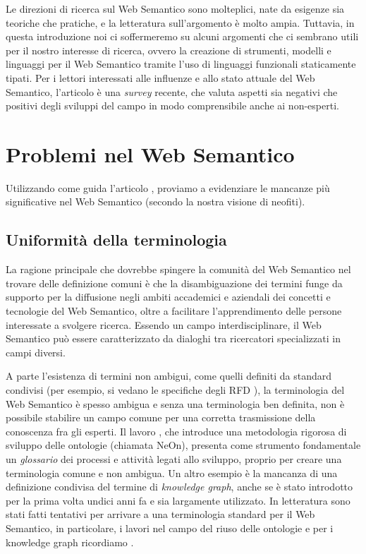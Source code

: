 Le direzioni di ricerca sul Web Semantico sono molteplici, nate da esigenze sia teoriche che pratiche, e la letteratura sull'argomento è molto ampia. Tuttavia, in questa introduzione noi ci soffermeremo su alcuni argomenti che ci sembrano utili per il nostro interesse di ricerca, ovvero la creazione di strumenti, modelli e linguaggi per il Web Semantico tramite l'uso di linguaggi funzionali staticamente tipati. Per i lettori interessati alle influenze e allo stato attuale del Web Semantico, l'articolo \cite{hitzler2021review} è una \emph{survey} recente, che valuta aspetti sia negativi che positivi degli sviluppi del campo in modo comprensibile anche ai non-esperti.
\section{Problemi nel Web Semantico}
Utilizzando come guida l'articolo \cite{hitzler2021review}, proviamo a evidenziare le mancanze più significative nel Web Semantico (secondo la nostra visione di neofiti).
\subsection{Uniformità della terminologia}
\label{sec:consolidamentoTerminologia}
La ragione principale che dovrebbe spingere la comunità del Web Semantico nel trovare delle definizione comuni è che la disambiguazione dei termini funge da supporto per la diffusione negli ambiti accademici e aziendali dei concetti e tecnologie del Web Semantico, oltre a facilitare l'apprendimento delle persone interessate a svolgere ricerca. Essendo un campo interdisciplinare, il Web Semantico può essere caratterizzato da dialoghi tra ricercatori specializzati in campi diversi.
	
A parte l'esistenza di termini non ambigui, come quelli definiti da standard condivisi (per esempio, si vedano le specifiche degli RFD \cite{RDFspecification}), la terminologia del Web Semantico è spesso ambigua e senza una terminologia ben definita, non è possibile stabilire un campo comune per una corretta trasmissione della conoscenza fra gli esperti. Il lavoro \cite{NeOn}, che introduce una metodologia rigorosa di sviluppo delle ontologie (chiamata NeOn), presenta come strumento fondamentale un \emph{glossario} dei processi e attività legati allo sviluppo, proprio per creare una terminologia comune e non ambigua.  Un altro esempio è la mancanza di una definizione condivisa del termine di \textit{knowledge graph}, anche se è stato introdotto per la prima volta undici anni fa e sia largamente utilizzato. In letteratura sono stati fatti tentativi per arrivare a una terminologia standard per il Web Semantico, in particolare, i lavori \cite{katsumi2018ontology, goy2015ontologies, NeOn} nel campo del riuso delle ontologie e per i knowledge graph ricordiamo \cite{ehrlinger2016towards}. 
	
